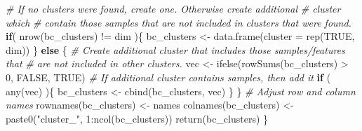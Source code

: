 \documentclass[
]{book}
\newenvironment{Shaded}{\begin{snugshade}}{\end{snugshade}}
\newcommand{\AttributeTok}[1]{\textcolor[rgb]{0.77,0.63,0.00}{#1}}
\newcommand{\CommentTok}[1]{\textcolor[rgb]{0.56,0.35,0.01}{\textit{#1}}}
\newcommand{\ConstantTok}[1]{\textcolor[rgb]{0.00,0.00,0.00}{#1}}
\newcommand{\ControlFlowTok}[1]{\textcolor[rgb]{0.13,0.29,0.53}{\textbf{#1}}}
\newcommand{\DecValTok}[1]{\textcolor[rgb]{0.00,0.00,0.81}{#1}}
\newcommand{\FunctionTok}[1]{\textcolor[rgb]{0.00,0.00,0.00}{#1}}
\newcommand{\NormalTok}[1]{#1}
\newcommand{\OtherTok}[1]{\textcolor[rgb]{0.56,0.35,0.01}{#1}}
\newcommand{\SpecialCharTok}[1]{\textcolor[rgb]{0.00,0.00,0.00}{#1}}
\newcommand{\StringTok}[1]{\textcolor[rgb]{0.31,0.60,0.02}{#1}}
\begin{document}
\begin{Shaded}
\begin{Highlighting}[]
  \CommentTok{\# If no clusters were found, create one. Otherwise create additional}
  \CommentTok{\# cluster which}
  \CommentTok{\# contain those samples that are not included in clusters that were found.}
  \ControlFlowTok{if}\NormalTok{( }\FunctionTok{nrow}\NormalTok{(bc\_clusters) }\SpecialCharTok{!=}\NormalTok{ dim )\{}
\NormalTok{      bc\_clusters }\OtherTok{\textless{}{-}} \FunctionTok{data.frame}\NormalTok{(}\AttributeTok{cluster =} \FunctionTok{rep}\NormalTok{(}\ConstantTok{TRUE}\NormalTok{, dim))}
\NormalTok{  \} }\ControlFlowTok{else}\NormalTok{ \{}
      \CommentTok{\# Create additional cluster that includes those samples/features that}
      \CommentTok{\# are not included in other clusters.}
\NormalTok{      vec }\OtherTok{\textless{}{-}} \FunctionTok{ifelse}\NormalTok{(}\FunctionTok{rowSums}\NormalTok{(bc\_clusters) }\SpecialCharTok{\textgreater{}} \DecValTok{0}\NormalTok{, }\ConstantTok{FALSE}\NormalTok{, }\ConstantTok{TRUE}\NormalTok{)}
      \CommentTok{\# If additional cluster contains samples, then add it}
      \ControlFlowTok{if}\NormalTok{ ( }\FunctionTok{any}\NormalTok{(vec) )\{}
\NormalTok{          bc\_clusters }\OtherTok{\textless{}{-}} \FunctionTok{cbind}\NormalTok{(bc\_clusters, vec)}
\NormalTok{      \}}
\NormalTok{  \}}
  \CommentTok{\# Adjust row and column names}
  \FunctionTok{rownames}\NormalTok{(bc\_clusters) }\OtherTok{\textless{}{-}}\NormalTok{ names}
  \FunctionTok{colnames}\NormalTok{(bc\_clusters) }\OtherTok{\textless{}{-}} \FunctionTok{paste0}\NormalTok{(}\StringTok{"cluster\_"}\NormalTok{, }\DecValTok{1}\SpecialCharTok{:}\FunctionTok{ncol}\NormalTok{(bc\_clusters))}
  \FunctionTok{return}\NormalTok{(bc\_clusters)}
\NormalTok{\}}
\end{Highlighting}
\end{Shaded}

\begin{Shaded}
\end{Shaded}
\end{document}
